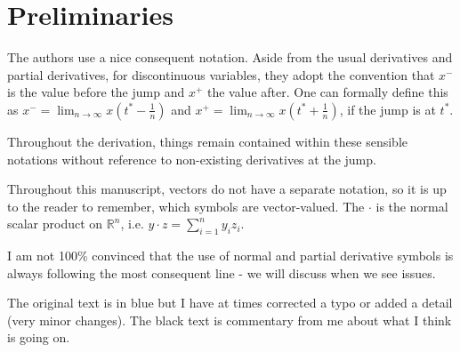 \documentclass[a4paper]{article}
\newcommand{\blue}[1]{{\color{blue}#1}}
\begin{document}
\section{Preliminaries}
The authors use a nice consequent notation. Aside from the usual
derivatives and partial derivatives, for discontinuous variables, they
adopt the convention that $x^-$ is the value before the jump and $x^+$
the value after. One can formally define this as $x^- = \lim_{n \to
  \infty} x(t^* - \frac{1}{n})$ and $x^+ = \lim_{n \to
  \infty} x(t^* + \frac{1}{n})$, if the jump is at $t^*$.

Throughout the derivation, things remain contained within these
sensible notations without reference to non-existing derivatives at
the jump.

Throughout this manuscript, vectors do not have a separate
notation, so it is up to the reader to remember, which symbols are
vector-valued. The $\cdot$ is the normal scalar product on ${\mathbb
  R}^n$, i.e. $y\cdot z = \sum_{i=1}^n y_iz_i$.

I am not 100\% convinced that the use of normal and partial derivative
symbols is always following the most consequent line - we will discuss
when we see issues.

The original text is in \blue{blue} but I have at times corrected a
typo or added a detail (very minor changes). The black text is
commentary from me about what I think is going on.
\end{document}

